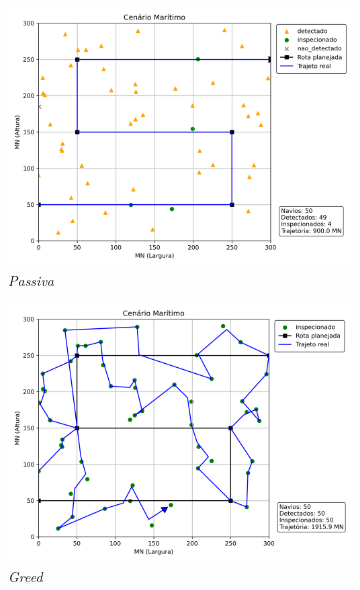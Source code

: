 \begin{figure}[H]
    \centering
    \begin{subfigure}{0.4\textwidth}
        \centering
        \includegraphics[width=\linewidth]{fig/passiva.png}
        \caption{\textit{Passiva}}
        \label{fig:trajetoria_passiva}
    \end{subfigure}
    \hfill
    \begin{subfigure}{0.4\textwidth}
        \centering
        \includegraphics[width=\linewidth]{fig/greed.png}
        \caption{\textit{Greed}}
        \label{fig:trajetoria_greed}
    \end{subfigure}
    \hfill
    \begin{subfigure}{0.4\textwidth}

\end{subfigure}
\end{figure}
